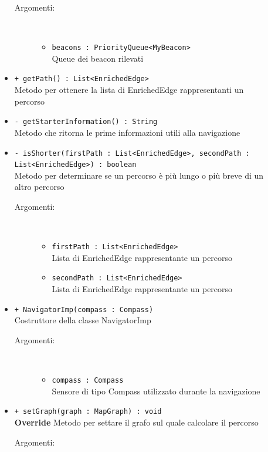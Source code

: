 \documentclass[../DefinizioneDiProdotto.tex]{subfiles}
\begin{document}
\begin{description}
\begin{itemize}
\begin{description}
\item[Argomenti:] \
\begin{itemize}
\item \texttt{beacons : PriorityQueue<MyBeacon>}\\
Queue dei beacon rilevati\end{itemize}
\end{description}
\item \texttt{+ getPath() : List<EnrichedEdge>}\\
Metodo per ottenere la lista di EnrichedEdge rappresentanti un percorso
 \item \texttt{- getStarterInformation() : String}\\
Metodo che ritorna le prime informazioni utili alla navigazione
 \item \texttt{- isShorter(firstPath : List<EnrichedEdge>, secondPath : List<EnrichedEdge>) : boolean}\\
Metodo per determinare se un percorso è più lungo o più breve di un altro percorso
 \begin{description}
\item[Argomenti:] \
\begin{itemize}
\item \texttt{firstPath : List<EnrichedEdge>}\\
Lista di EnrichedEdge rappresentante un percorso\item \texttt{secondPath : List<EnrichedEdge>}\\
Lista di EnrichedEdge rappresentante un percorso\end{itemize}
\end{description}
\item \texttt{+ NavigatorImp(compass : Compass)}\\
Costruttore della classe NavigatorImp
 \begin{description}
\item[Argomenti:] \
\begin{itemize}
\item \texttt{compass : Compass}\\
Sensore di tipo Compass utilizzato durante la navigazione\end{itemize}
\end{description}
\item \texttt{+ setGraph(graph : MapGraph) : void}\\
\textbf{Override} Metodo per settare il grafo sul quale calcolare il percorso
 \begin{description}
\item[Argomenti:] \

\end{description}
\end{itemize}
\end{description}
\end{document}
